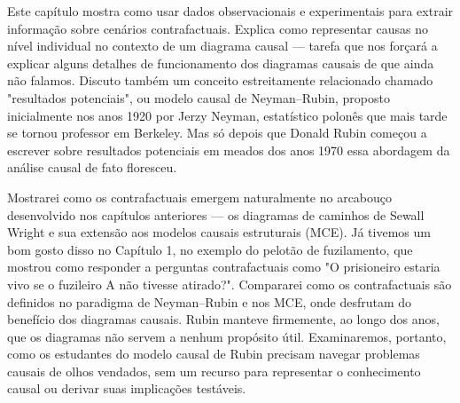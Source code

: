 \documentclass[11pt,a5paper,twoside]{book}
\begin{document}
Este capítulo mostra como usar dados observacionais e experimentais para extrair informação sobre cenários contrafactuais. Explica como representar causas no nível individual no contexto de um diagrama causal — tarefa que nos forçará a explicar alguns detalhes de funcionamento dos diagramas causais de que ainda não falamos. Discuto também um conceito estreitamente relacionado chamado "resultados potenciais", ou modelo causal de Neyman–Rubin, proposto inicialmente nos anos 1920 por Jerzy Neyman, estatístico polonês que mais tarde se tornou professor em Berkeley. Mas só depois que Donald Rubin começou a escrever sobre resultados potenciais em meados dos anos 1970 essa abordagem da análise causal de fato floresceu.

Mostrarei como os contrafactuais emergem naturalmente no arcabouço desenvolvido nos capítulos anteriores — os diagramas de caminhos de Sewall Wright e sua extensão aos modelos causais estruturais (MCE). Já tivemos um bom gosto disso no Capítulo 1, no exemplo do pelotão de fuzilamento, que mostrou como responder a perguntas contrafactuais como "O prisioneiro estaria vivo se o fuzileiro A não tivesse atirado?". Compararei como os contrafactuais são definidos no paradigma de Neyman–Rubin e nos MCE, onde desfrutam do benefício dos diagramas causais. Rubin manteve firmemente, ao longo dos anos, que os diagramas não servem a nenhum propósito útil. Examinaremos, portanto, como os estudantes do modelo causal de Rubin precisam navegar problemas causais de olhos vendados, sem um recurso para representar o conhecimento causal ou derivar suas implicações testáveis.
\end{document}
